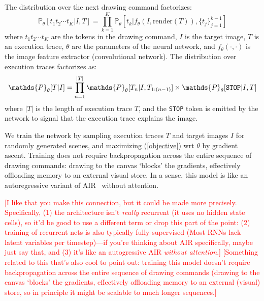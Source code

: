 \documentclass{article}
\newcommand{\probability}{\mathds{P}} %
\newcommand{\remark}[1]{\textcolor{red}{[#1]}}
\begin{document}
The distribution over the next drawing command factorizes:
\begin{equation}
  \probability_\theta [t_1t_2\cdots t_K | I,T] = \prod_{k = 1}^K \probability_\theta [t_k | f_\theta(I,\text{render}(T)), \{t_j\}_{j = 1}^{k - 1}]
\end{equation}
where $t_1t_2\cdots t_K$ are the tokens in the drawing command, $I$ is
the target image, $T$ is an execution trace, $\theta$ are the
parameters of the neural network, and $f_\theta(\cdot,\cdot)$ is the
image feature extractor (convolutional network). The distribution over
execution traces factorizes as:
\begin{equation}
  \probability_\theta [T|I] = \prod_{n = 1}^{|T|} \probability_\theta [T_n | I,T_{1:(n-1)}]\times\probability_\theta [\verb|STOP| | I,T]\label{objective}
\end{equation}
where $|T|$ is the length of execution trace $T$, and the \verb|STOP|
token is emitted by the network to signal that the execution trace
explains the image.

We train the network by sampling execution traces $T$ and target
images $I$ for randomly generated scenes, and maximizing
(\ref{objective}) wrt $\theta$ by gradient ascent.
Training does not require backpropagation across the entire sequence of drawing commands:
drawing to the canvas `blocks' the gradients,
effectively offloading memory to an external visual store.
In a sense, this model is like an autoregressive variant of AIR~\cite{eslami1603attend} without attention.

\remark{I like that you make this connection, but it could be made more precisely. Specifically, (1) the architecture isn't \emph{really} recurrent (it uses no hidden state cells), so it'd be good to use a different term or drop this part of the point: (2) training of recurrent nets is also typically fully-supervised (Most RNNs lack latent variables per timestep)---if you're thinking about AIR specifically, maybe just say that, and (3) it's like an autogressive AIR \emph{without attention}.}
\remark{Something related to this that's also cool to point out: training this model doesn't require backpropagation across the entire sequence of drawing commands (drawing to the canvas `blocks' the gradients, effectively offloading memory to an external (visual) store, so in principle it might be scalable to much longer sequences.}

\end{document}

